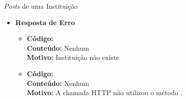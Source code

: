 \begin{caixa}{\emph{Posts} de uma Instituição}{}
\begin{itemize}
\item \textbf{Resposta de Erro}
	\begin{itemize}
		\item \textbf{Código:}  \\ \textbf{Conteúdo:} Nenhum \\ \textbf{Motivo:} Instituição não existe
        \item \textbf{Código:}  \\ \textbf{Conteúdo:} Nenhum \\ \textbf{Motivo:} A chamada HTTP não utilizou o método .
	\end{itemize}

\end{itemize}
\end{caixa}


